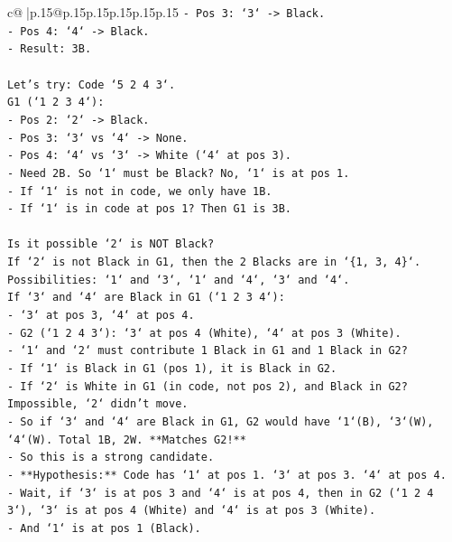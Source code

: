 \documentclass{article}
\begin{document}
{\begin{supertabular}{c@{$\;$}|p{.15\linewidth}@{}p{.15\linewidth}p{.15\linewidth}p{.15\linewidth}p{.15\linewidth}p{.15\linewidth}}
{{{\texttt{{-} Pos 3: `3` {-}> Black.} \\
\texttt{{-} Pos 4: `4` {-}> Black.} \\
\texttt{{-} Result: 3B.} \\
\\ 
\texttt{Let's try: Code `5 2 4 3`.} \\
\texttt{G1 (`1 2 3 4`):} \\
\texttt{{-} Pos 2: `2` {-}> Black.} \\
\texttt{{-} Pos 3: `3` vs `4` {-}> None.} \\
\texttt{{-} Pos 4: `4` vs `3` {-}> White (`4` at pos 3).} \\
\texttt{{-} Need 2B. So `1` must be Black? No, `1` is at pos 1.} \\
\texttt{{-} If `1` is not in code, we only have 1B.} \\
\texttt{{-} If `1` is in code at pos 1? Then G1 is 3B.} \\
\\ 
\texttt{Is it possible `2` is NOT Black?} \\
\texttt{If `2` is not Black in G1, then the 2 Blacks are in `\{1, 3, 4\}`.} \\
\texttt{Possibilities: `1` and `3`, `1` and `4`, `3` and `4`.} \\
\texttt{If `3` and `4` are Black in G1 (`1 2 3 4`):} \\
\texttt{{-} `3` at pos 3, `4` at pos 4.} \\
\texttt{{-} G2 (`1 2 4 3`): `3` at pos 4 (White), `4` at pos 3 (White).} \\
\texttt{{-} `1` and `2` must contribute 1 Black in G1 and 1 Black in G2?} \\
\texttt{{-} If `1` is Black in G1 (pos 1), it is Black in G2.} \\
\texttt{{-} If `2` is White in G1 (in code, not pos 2), and Black in G2? Impossible, `2` didn't move.} \\
\texttt{{-} So if `3` and `4` are Black in G1, G2 would have `1`(B), `3`(W), `4`(W). Total 1B, 2W. **Matches G2!**} \\
\texttt{{-} So this is a strong candidate.} \\
\texttt{{-} **Hypothesis:** Code has `1` at pos 1. `3` at pos 3. `4` at pos 4.} \\
\texttt{{-} Wait, if `3` is at pos 3 and `4` is at pos 4, then in G2 (`1 2 4 3`), `3` is at pos 4 (White) and `4` is at pos 3 (White).} \\
\texttt{{-} And `1` is at pos 1 (Black).} \\
}}}
\end{supertabular}}
\end{document}
